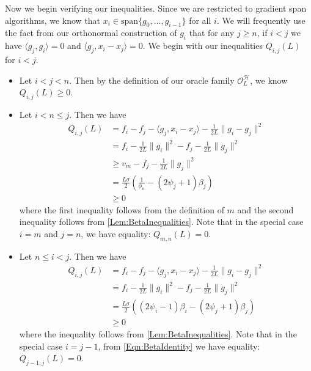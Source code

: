 \documentclass[11pt]{article}
\numberwithin{equation}{section}
\theoremstyle{definition}
\theoremstyle{plain}
\theoremstyle{definition}
\begin{document}
Now we begin verifying our inequalities. Since we are restricted to gradient span algorithms, we know that $x_i \in \text{span}\{g_0, \dots, g_{i-1}\}$ for all $i$. We will frequently use the fact from our orthonormal construction of $g_i$ that for any $j \geq n$, if $i<j$ we have $\langle g_j, g_i \rangle = 0$ and $\langle g_j, x_i - x_j \rangle = 0$. We begin with our inequalities $Q_{i,j}(L)$ for $i<j$.

\begin{itemize}
    \item Let $i < j < n$. Then by the definition of our oracle family $\mathcal{O}_L^\mathcal{H}$, we know $Q_{i,j}(L) \geq 0$.
    \item Let $i < n \leq j$. Then we have
\begin{align*}
    Q_{i,j}(L) &= f_i - f_j - \langle g_j, x_i - x_j \rangle - \frac{1}{2L}\|g_i - g_j\|^2 \\
    &= f_i - \frac{1}{2L}\|g_i\|^2 - f_j - \frac{1}{2L}\|g_j\|^2 \\
    & \geq v_m - f_j - \frac{1}{2L} \|g_j\|^2 \\
    & = \frac{L \sigma}{2} \left( \frac{1}{\phi_n} - (2 \psi_j + 1) \beta_j \right) \\
    & \geq 0
\end{align*}
where the first inequality follows from the definition of $m$ and the second inequality follows from \cref{Lem:BetaInequalities}. Note that in the special case $i=m$ and $j=n$, we have equality: $Q_{m,n}(L) = 0$.

\item Let $n \leq i < j$. Then we have
\begin{align*}
    Q_{i,j}(L) &= f_i - f_j - \langle g_j, x_i - x_j \rangle - \frac{1}{2L}\|g_i - g_j\|^2 \\
    &= f_i - \frac{1}{2L}\|g_i\|^2 - f_j - \frac{1}{2L}\|g_j\|^2 \\
    & = \frac{L \sigma}{2} \left( (2 \psi_i - 1) \beta_i - (2 \psi_j + 1) \beta_j  \right) \\
    & \geq 0
\end{align*}
where the inequality follows from \cref{Lem:BetaInequalities}. Note that in the special case $i=j-1$, from \eqref{Eqn:BetaIdentity} we have equality: $Q_{j-1,j}(L) = 0$.
\end{itemize}
\end{document}

